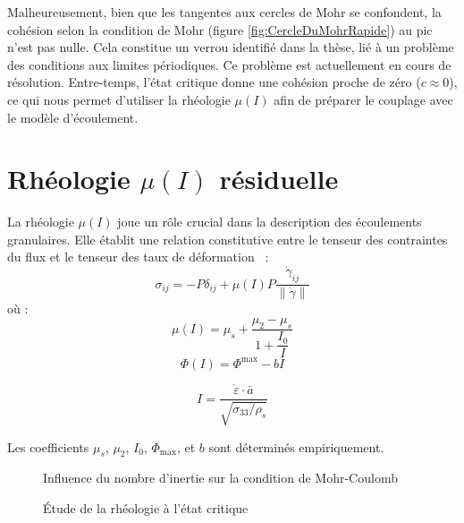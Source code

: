 \documentclass[a4paper,12pt]{report}
\begin{document}
Malheureusement, bien que les tangentes aux cercles de Mohr se confondent, la cohésion selon la condition de Mohr (figure \ref{fig:CercleDuMohrRapide}) au pic n’est pas nulle.  
Cela constitue un verrou identifié dans la thèse, lié à un problème des conditions aux limites périodiques. Ce problème est actuellement en cours de résolution.  
Entre-temps, l’état critique donne une cohésion proche de zéro ($c \approx 0$), ce qui nous permet d’utiliser la rhéologie $\mu(I)$ afin de préparer le couplage avec le modèle d’écoulement.

\section{Rhéologie $\mu(I)$ résiduelle}

La rhéologie $\mu(I)$ joue un rôle crucial dans la description des écoulements granulaires. Elle établit une relation constitutive entre le tenseur des contraintes du flux et le tenseur des taux de déformation~\citep{jop2006constitutive} :
\begin{equation}
\sigma_{ij} = -P \delta_{ij} + \mu(I) P \frac{\dot{\gamma}_{ij}}{\lVert \dot{\gamma} \rVert}
\label{flowTensor}
\end{equation}
où :
\begin{equation}
\mu(I) = \mu_s + \dfrac{\mu_2 - \mu_s}{1 + \dfrac{I_0}{I}}
\label{muI}
\end{equation}
\begin{equation}
\Phi(I) = \Phi^{\max} - bI
\label{phiI}
\end{equation}

\begin{equation}
I =  \frac{\dot{\varepsilon} \cdot \bar{a}}{\sqrt{\sigma_{33}/\rho_s}}
\label{IMacro}
\end{equation}

Les coefficients $\mu_s$, $\mu_2$, $I_0$, $\Phi_{\max}$, et $b$ sont déterminés empiriquement.

\begin{figure}[h!]
    \centering
  \caption{Influence du nombre d’inertie sur la condition de Mohr-Coulomb}
  \label{fig:IResiduel}
\end{figure}

\begin{figure}[h!]
    \centering
    \subfloat[$\mu(I)$]{\scalebox{0.49}{\small }\label{fig:etudeSurI2}}
    \subfloat[$\Phi(I)$]{\scalebox{0.49}{\small }\label{fig:cercleResiduel2}}
  \caption{Étude de la rhéologie à l’état critique}
  \label{fig:Rheologie}
\end{figure}
\end{document}
